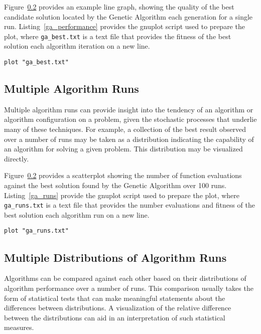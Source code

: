 \documentclass[a4paper, 11pt]{article}
\begin{document}
Figure~\ref{} provides an example line graph, showing the quality of the best candidate solution located by the Genetic Algorithm each generation for a single run. Listing~\ref{ga_performance} provides the gnuplot script used to prepare the plot, where \texttt{ga\_best.txt} is a text file that provides the fitness of the best solution each algorithm iteration on a new line.


\begin{lstlisting}[caption=Plot of the best candidate solution found by the Genetic Algorithm each iteration, label=ga_performance]
plot "ga_best.txt"
\end{lstlisting}

\subsection{Multiple Algorithm Runs}
Multiple algorithm runs can provide insight into the tendency of an algorithm or algorithm configuration on a problem, given the stochastic processes that underlie many of these techniques. For example, a collection of the best result observed over a number of runs may be taken as a distribution indicating the capability of an algorithm for solving a given problem. This distribution may be visualized directly. 

Figure~\ref{} provides a scatterplot showing the number of function evaluations against the best solution found by the Genetic Algorithm over 100 runs. Listing~\ref{ga_runs} provide the gnuplot script used to prepare the plot, where \texttt{ga\_runs.txt} is a text file that provides the number evaluations and fitness of the best solution each algorithm run on a new line. 


\begin{lstlisting}[caption=Scatterplot of objective function evaluations against quality of best solution found over 100 runs of a Genetic Algorithm, label=ga_runs]
plot "ga_runs.txt"
\end{lstlisting}

\subsection{Multiple Distributions of Algorithm Runs}
Algorithms can be compared against each other based on their distributions of algorithm performance over a number of runs. This comparison usually takes the form of statistical tests that can make meaningful statements about the differences between distributions. A visualization of the relative difference between the distributions can aid in an interpretation of such statistical measures. 
\end{document}
